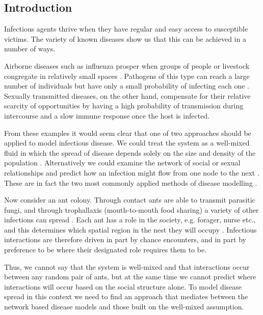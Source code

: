 \documentclass[10pt]{article}
\begin{document}
\begin{multicols}{2}
\section{Introduction}
\noindent
Infectious agents thrive when they have regular and easy access to susceptible victims. The variety of known diseases show us that this can be achieved in a number of ways. 

Airborne diseases such as influenza prosper when groups of people or livestock congregate in relatively small spaces \cite{doi:10.1093/oxfordjournals.aje.a112781,koopmans2004transmission}. Pathogens of this type can reach a large number of individuals but have only a small probability of infecting each one \cite{doi:10.1093/infdis/jis773}. Sexually transmitted diseases, on the other hand, compensate for their relative scarcity of opportunities by having a high probability of transmission during intercourse and a slow immune response once the host is infected. 

From these examples it would seem clear that one of two approaches should be applied to model infectious disease. We could treat the system as a well-mixed fluid in which the spread of disease depends solely on the size and density of the population \cite{de1995does,anderson1992infectious}. Alternatively we could examine the network of social or sexual relationships and predict how an infection might flow from one node to the next \cite{rothenberg1998using}. These are in fact the two most commonly applied methods of disease modelling \cite{begon2002clarification,Bansal879}.

Now consider an ant colony. Through contact ants are able to transmit parasitic fungi, and through trophallaxis (mouth-to-mouth food sharing) a variety of other infections can spread \cite{greenwald2015ant,10.7554/eLife.20375}. Each ant has a role in the society, e.g. forager, nurse etc., and this determines which spatial region in the nest they will occupy \cite{gadau2009organization,Mersch1090}. Infectious interactions are therefore driven in part by chance encounters, and in part by preference to be where their designated role requires them to be. 

Thus, we cannot say that the system is well-mixed and that interactions occur between any random pair of ants, but at the same time we cannot predict where interactions will occur based on the social structure alone. To model disease spread in this context we need to find an approach that mediates between the network based disease models and those built on the well-mixed assumption.


\end{multicols}
\end{document}

